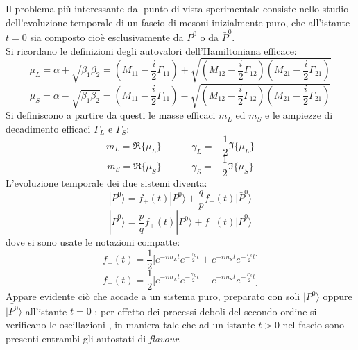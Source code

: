 Il problema pi\`u interessante dal punto di vista sperimentale consiste nello studio dell'evoluzione temporale di un fascio di mesoni inizialmente puro, che all'istante $t = 0$ sia composto cio\`e esclusivamente da $P^0$ o da $\bar{P}^0$. \\
Si ricordano le definizioni degli autovalori dell'Hamiltoniana efficace:
\begin{equation}
\mu_L =  \alpha + \sqrt{\beta_1\beta_2} = (M_{11} - \frac{i}{2} \Gamma_{11}) + \sqrt{(M_{12} - \frac{i}{2} \Gamma_{12})(M_{21} - \frac{i}{2} \Gamma_{21})}
\end{equation}
\begin{equation}
\mu_S =  \alpha - \sqrt{\beta_1\beta_2} = (M_{11} - \frac{i}{2} \Gamma_{11}) - \sqrt{(M_{12} - \frac{i}{2} \Gamma_{12})(M_{21} - \frac{i}{2} \Gamma_{21})}
\end{equation}
Si definiscono a partire da questi le masse efficaci $m_L$ ed $m_S$ e le ampiezze di decadimento efficaci $\Gamma_L$ e $\Gamma_S$:
\begin{equation}
m_L = \Re\{\mu_L\} \ \ \ \ \ \ \ \ \ \ \ \ \ \ \gamma_L = -\frac{1}{2}\Im\{\mu_L\} 
\end{equation}
\begin{equation}
m_S = \Re\{\mu_S\} \ \ \ \ \ \ \ \ \ \ \ \ \ \ \gamma_S = -\frac{1}{2}\Im\{\mu_S\} 
\end{equation}
L'evoluzione temporale dei due sistemi diventa:
\begin{equation}
 |P^0\rangle = f_+(t) |P^0\rangle + \frac{q}{p}f_-(t) |\bar{P}^0\rangle 
\end{equation}
\begin{equation}
 |\bar{P}^0\rangle = \frac{p}{q}f_+(t) |P^0\rangle + f_-(t) |\bar{P}^0\rangle 
\end{equation}
dove si sono usate le notazioni compatte:
\begin{equation}
 f_+(t) = \frac{1}{2} \Big[e^{-im_Lt}e^{-\frac{\gamma_L}{2}t} + e^{-im_St}e^{-\frac{\Gamma_S}{2}t}\Big]
\end{equation}
\begin{equation}
 f_-(t) = \frac{1}{2} \Big[e^{-im_Lt}e^{-\frac{\gamma_L}{2}t} - e^{-im_St}e^{-\frac{\Gamma_S}{2}t}\Big]
\end{equation}
Appare evidente ciò che accade a un sistema puro, preparato con soli $|P^0\rangle$ oppure $\bar{|P^0}\rangle$ all'istante $t = 0$ : per effetto dei processi deboli 
del secondo ordine si verificano le oscillazioni , in maniera tale che ad un istante $t>0$ nel fascio sono presenti entrambi gli autostati di \emph{flavour}. 
